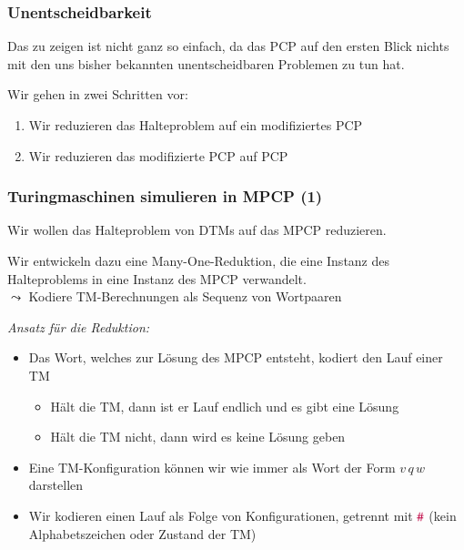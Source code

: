 \documentclass[onlymath]{beamer}
\begin{document}
\begin{frame}\frametitle{Unentscheidbarkeit}

\pause

Das zu zeigen ist nicht ganz so einfach, da das PCP auf den ersten Blick
nichts mit den uns bisher bekannten unentscheidbaren Problemen zu tun hat.
\bigskip

Wir gehen in zwei Schritten vor:
\begin{enumerate}[(1)]
\item Wir reduzieren das Halteproblem auf ein \alert{modifiziertes PCP}
\item Wir reduzieren das modifizierte PCP auf PCP
\end{enumerate}\bigskip\pause


\end{frame}

\begin{frame}\frametitle{Turingmaschinen simulieren in MPCP (1)}

Wir wollen das Halteproblem von DTMs auf das MPCP reduzieren.\medskip

Wir entwickeln dazu eine \alert{Many-One-Reduktion}, die eine Instanz des Halteproblems
in eine Instanz des MPCP verwandelt.\\
$\leadsto$ Kodiere TM-Berechnungen als Sequenz von Wortpaaren
\bigskip\pause

\emph{Ansatz für die Reduktion:}
\begin{itemize}
\item Das Wort, welches zur Lösung des MPCP entsteht, kodiert den Lauf einer TM
\begin{itemize}
\item Hält die TM, dann ist er Lauf endlich und es gibt eine Lösung
\item Hält die TM nicht, dann wird es keine Lösung geben
\end{itemize}
\item Eine TM-Konfiguration können wir wie immer als Wort der Form $v\, q\, w$ darstellen
\item Wir kodieren einen Lauf als Folge von Konfigurationen, getrennt mit $\mathtt{\textcolor{purple}{\#}}$ (kein Alphabetszeichen oder Zustand der TM)
\end{itemize}

\end{frame}
\end{document}
